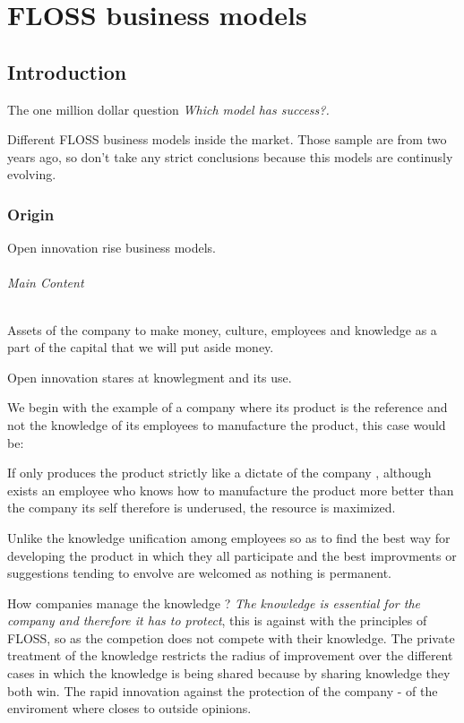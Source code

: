 \chapter{FLOSS business models}

\section{Introduction}\label{lesson-4-introduction}

The one million dollar question \emph{Which model has success?.}

Different FLOSS business models inside the market. Those sample are from two years ago, so don't take any strict conclusions because this models are continusly evolving.

\subsection{Origin}\label{lesson-4-origin}

Open innovation rise business models.

\subparagraph{Main Content}

Assets of the company to make money, culture, employees and knowledge as a part
of the capital that we will put aside money.

Open innovation stares at knowlegment and its use.

We begin with the example of a company where its product is the reference and
not the knowledge of its employees to manufacture the product, this case would
be:

If only produces the product strictly like a dictate of the company , although
exists an employee who knows how to manufacture the product more better than the
company its self therefore is underused, the resource is maximized.

Unlike the knowledge unification among employees so as to find the best way for
developing the product in which they all participate and the best improvments or
suggestions tending to envolve are welcomed as nothing is permanent.

How companies manage the knowledge ? \emph{The knowledge is essential for the
company and therefore it has to protect}, this is against with the
principles of  FLOSS, so as the competion does not compete with their
knowledge. The private treatment of the knowledge restricts the radius of
improvement over the different cases in which the knowledge is being shared because by sharing knowledge they both
win. The rapid innovation against the protection of the company - of the
enviroment where closes to outside opinions.


